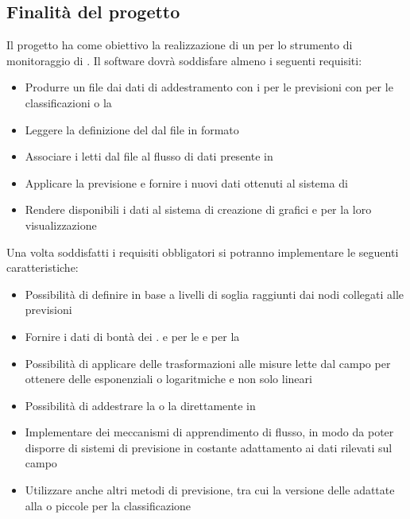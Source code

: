 \documentclass[../studio-di-fattibilita.tex]{subfiles}
\begin{document}
\subsection{Finalità del progetto}%
\label{sub:finalita_del_progetto}
Il progetto ha come obiettivo la realizzazione di un  per lo strumento di monitoraggio di .
Il software dovrà soddisfare almeno i seguenti requisiti:
\begin{itemize}
  \item Produrre un file  dai dati di addestramento con i  per le previsioni con  per le classificazioni o la  
  \item Leggere la definizione del  dal file in formato 
  \item Associare i  letti dal file  al flusso di dati presente in 
  \item Applicare la previsione e fornire i nuovi dati ottenuti al sistema di 
  \item Rendere disponibili i dati al sistema di creazione di grafici e  per la loro visualizzazione   
\end{itemize}
Una volta soddisfatti i requisiti obbligatori si potranno implementare le seguenti caratteristiche:
\begin{itemize}
  \item Possibilità di definire  in base a livelli di soglia raggiunti dai nodi collegati alle previsioni
  \item Fornire i dati di bontà dei .  e  per le  e  per la 
  \item Possibilità di applicare delle trasformazioni alle misure lette dal campo per ottenere delle  esponenziali o logaritmiche e non solo lineari
  \item Possibilità di addestrare la  o la  direttamente in 
  \item Implementare dei meccanismi di apprendimento di flusso, in modo da poter disporre di sistemi di previsione in costante adattamento ai dati rilevati sul campo
  \item Utilizzare anche altri metodi di previsione, tra cui la versione delle  adattate alla  o piccole  per la classificazione   
\end{itemize}
\end{document}
